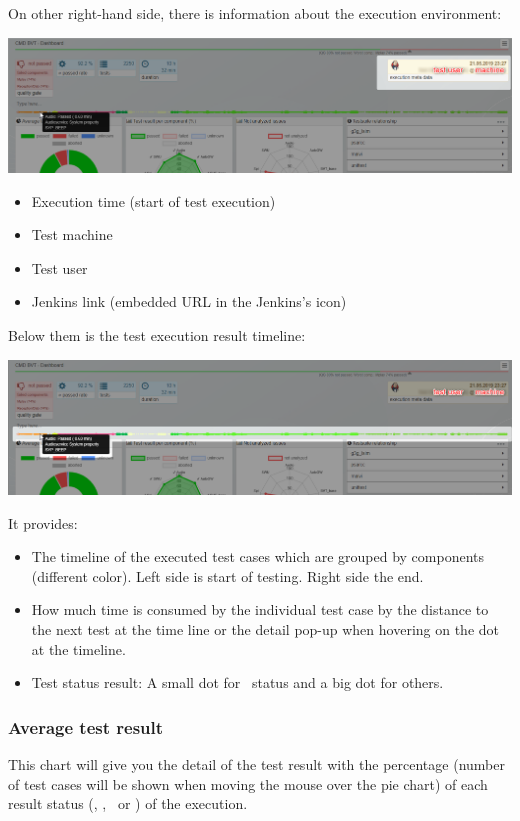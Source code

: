 On other right-hand side, there is information about the execution environment:

\includegraphics[width=1\linewidth]{./pictures/dashboard/result_environment.png}
\begin{itemize}
   \item Execution time (start of test execution)
   \item Test machine
   \item Test user
   \item Jenkins link (embedded URL in the Jenkins's icon)
\end{itemize}

Below them is the test execution result timeline:

\includegraphics[width=1\linewidth]{./pictures/dashboard/result_timeline.png}

It provides:
\begin{itemize}
   \item The timeline of the executed test cases which are grouped by components 
         (different color). Left side is start of testing. Right side the end.
   \item How much time is consumed by the individual test case by the distance 
         to the next test at the time line or the detail pop-up when hovering on the 
         dot at the timeline.
   \item Test status result: A small dot for \passed\ status and a big dot 
         for others.
\end{itemize}


\subsubsection{Average test result} 
This chart will give you the detail of the test 
result with the percentage (number of test cases will be shown when moving the mouse 
over the pie chart) of each result status (\passed, \failed, 
\unknown\ or \aborted) of the execution. 

